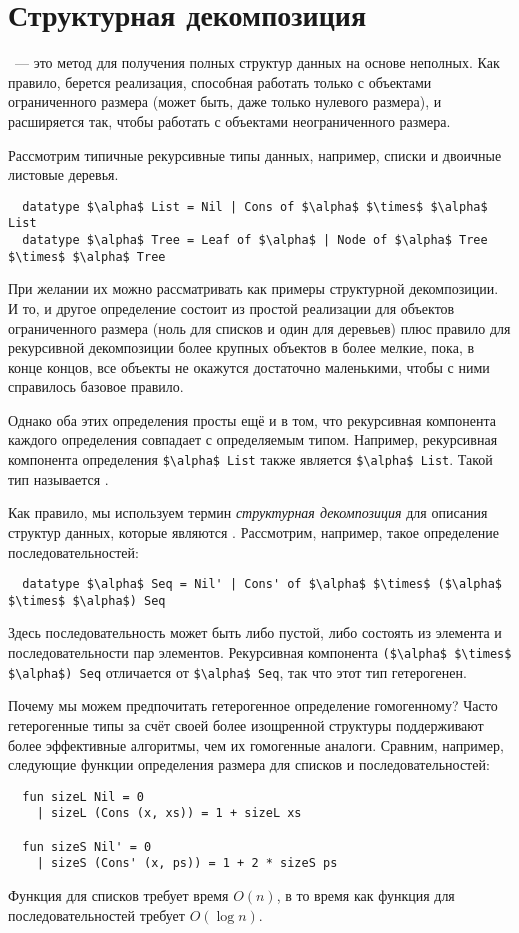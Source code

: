 \section{Структурная декомпозиция}
\label{sc:10.1}

~--- это
метод для получения полных структур данных на основе неполных.  Как
правило, берется реализация, способная работать только с объектами
ограниченного размера (может быть, даже только нулевого размера), и
расширяется так, чтобы работать с объектами неограниченного размера.

Рассмотрим типичные рекурсивные типы данных, например, списки и
двоичные листовые деревья.
\begin{lstlisting}
  datatype $\alpha$ List = Nil | Cons of $\alpha$ $\times$ $\alpha$ List
  datatype $\alpha$ Tree = Leaf of $\alpha$ | Node of $\alpha$ Tree $\times$ $\alpha$ Tree
\end{lstlisting}
При желании их можно рассматривать как примеры структурной
декомпозиции. И то, и другое определение состоит из простой реализации
для объектов ограниченного размера (ноль для списков и один для
деревьев) плюс правило для рекурсивной декомпозиции более крупных
объектов в более мелкие, пока, в конце концов, все объекты не окажутся
достаточно маленькими, чтобы с ними справилось базовое правило.

Однако оба этих определения просты ещё и в том, что рекурсивная
компонента каждого определения совпадает с определяемым
типом. Например, рекурсивная компонента определения
\lstinline!$\alpha$ List! также является \lstinline!$\alpha$ List!.
Такой тип называется .

Как правило, мы используем термин \emph{структурная декомпозиция} для
описания структур данных, которые являются
. Рассмотрим, например, такое
определение последовательностей:
\begin{lstlisting}
  datatype $\alpha$ Seq = Nil' | Cons' of $\alpha$ $\times$ ($\alpha$ $\times$ $\alpha$) Seq
\end{lstlisting}
Здесь последовательность может быть либо пустой, либо состоять из
элемента и последовательности пар элементов. Рекурсивная компонента
\lstinline!($\alpha$ $\times$ $\alpha$) Seq! отличается от
\lstinline!$\alpha$ Seq!, так что этот тип гетерогенен.

Почему мы можем предпочитать гетерогенное определение гомогенному?
Часто гетерогенные типы за счёт своей более изощренной структуры поддерживают
более эффективные алгоритмы, чем их гомогенные аналоги. Сравним,
например, следующие функции определения размера для списков и
последовательностей:
\begin{lstlisting}
  fun sizeL Nil = 0
    | sizeL (Cons (x, xs)) = 1 + sizeL xs

  fun sizeS Nil' = 0
    | sizeS (Cons' (x, ps)) = 1 + 2 * sizeS ps
\end{lstlisting}
Функция для списков требует время $O(n)$, в то время как функция для
последовательностей требует $O(\log n)$.

